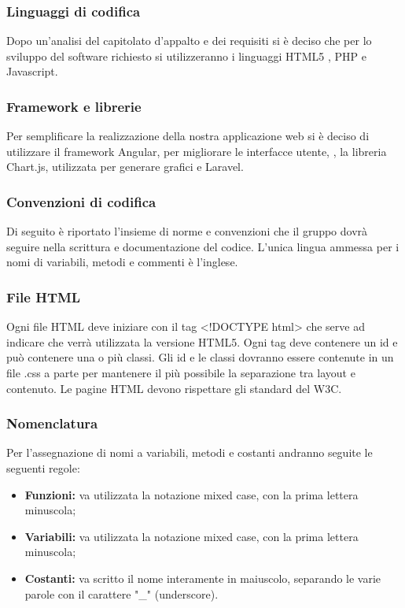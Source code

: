 \subsubsection{Linguaggi di codifica}
Dopo un'analisi del capitolato d'appalto e dei requisiti si è deciso che per lo sviluppo del software richiesto si utilizzeranno i linguaggi \gls{HTML5} , \gls{PHP} e \gls{Javascript}.

\subsubsection{Framework e librerie}
Per semplificare la realizzazione della nostra applicazione web si è deciso di utilizzare il \gls{framework} \gls{Angular}, per migliorare le interfacce utente, , la libreria \gls{Chart.js}, utilizzata per generare grafici e \gls{Laravel}.

\subsubsection{Convenzioni di codifica}
Di seguito è riportato l'insieme di norme e convenzioni che il gruppo dovrà seguire nella scrittura e documentazione del codice.
L'unica lingua ammessa per i nomi di variabili, metodi e commenti è l'inglese.

\subsubsection{File HTML}

Ogni file \gls{HTML} deve iniziare con il tag <!DOCTYPE html> che serve ad indicare che verrà utilizzata la versione \gls{HTML5}.
Ogni tag deve contenere un id e può contenere una o più classi.
Gli id e le classi dovranno essere contenute in un file .css a parte per mantenere il più possibile la separazione tra \gls{layout} e contenuto.
Le pagine \gls{HTML} devono rispettare gli standard del \gls{W3C}.

\subsubsection{Nomenclatura}
Per l'assegnazione di nomi a variabili, metodi e costanti andranno seguite le seguenti regole:
\begin{itemize}
	\item \textbf{Funzioni:} va utilizzata la notazione mixed case, con la prima lettera minuscola;
	\item \textbf{Variabili:} va utilizzata la notazione mixed case, con la prima lettera minuscola;
	\item \textbf{Costanti:} va scritto il nome interamente in maiuscolo, separando le varie parole con il carattere "\_" (underscore).
\end{itemize}

